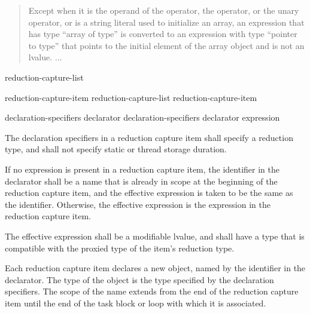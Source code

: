 \begin{quote}
Except when it
is the operand of the  operator,
the  operator,
or the unary \tcode{\&} operator,
or is a string literal used to initialize an array,
an expression that has type ``array of type''
is converted to an expression with type ``pointer to type''
that points to the initial element of the array object
and is not an lvalue. ...
\end{quote}



\begin{bnf}
\br
{} \terminal{(} reduction-capture-list \terminal{)}
\end{bnf}

\begin{bnf}
\br
reduction-capture-item
\br
reduction-capture-list \terminal{,} reduction-capture-item
\end{bnf}

\begin{bnf}
\br
declaration-specifiers declarator
\br
declaration-specifiers declarator \terminal{:} expression
\end{bnf}


\pnum
The declaration specifiers in a reduction capture item
shall specify a reduction type,
and shall not specify static or thread storage duration.

\pnum
If no expression is present in a reduction capture item,
the identifier in the declarator
shall be a name that is already in scope
at the beginning of the reduction capture item,
and the effective expression is taken to be the same as the identifier.
Otherwise, the effective expression
is the expression in the reduction capture item.

\pnum
The effective expression shall be a modifiable lvalue,
and shall have a type that is compatible with the proxied type
of the item's reduction type.


\pnum
Each reduction capture item declares a new object,
named by the identifier in the declarator.
The type of the object is the type specified by the declaration specifiers.
The scope of the name extends from the end of the reduction capture item
until the end of the task block or loop with which it is associated.

